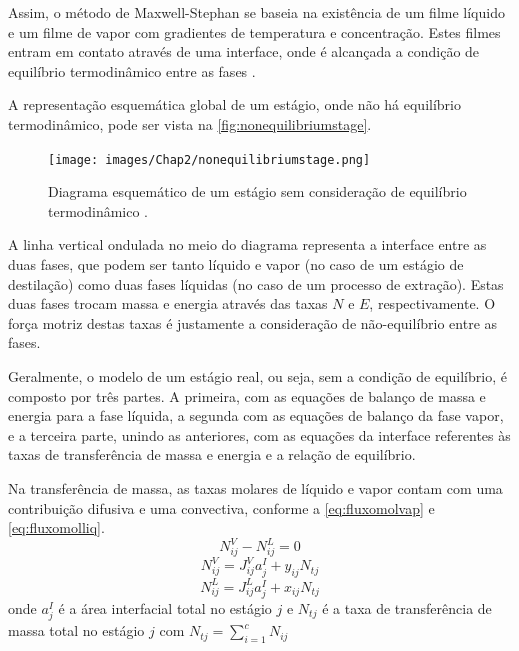 Assim, o método de Maxwell-Stephan se baseia na existência de um filme líquido e um filme de vapor com gradientes de
temperatura e concentração. Estes filmes entram em contato através de uma interface, onde é alcançada a condição de
equilíbrio termodinâmico entre as fases \cite{Koeijer:2004}.

A representação esquemática global de um estágio, onde não há equilíbrio termodinâmico, pode ser vista na
\autoref{fig:nonequilibriumstage}.
 \begin{figure}[htb]
 \centering \texttt{[image: images/Chap2/nonequilibriumstage.png]}
 \caption{Diagrama esquemático de um estágio sem consideração de equilíbrio termodinâmico \cite{Kooijman:1995a}.}
 \label{fig:nonequilibriumstage}
 \end{figure}
A linha vertical ondulada no meio do diagrama representa a interface entre as duas fases, que podem ser tanto líquido e
vapor (no caso de um estágio de destilação) como duas fases líquidas (no caso de
um processo de extração). Estas duas fases trocam massa e energia através das
taxas $N$ e $E$, respectivamente. O força motriz destas taxas é justamente a
consideração de não-equilíbrio entre as fases.

Geralmente, o modelo de um estágio real, ou seja, sem a condição de equilíbrio, é composto por três partes. A primeira,
com as equações de balanço de massa e energia para a fase líquida, a segunda com as equações de balanço da fase vapor,
e a terceira parte, unindo as anteriores, com as equações da interface referentes às taxas de transferência de massa
e energia e a relação de equilíbrio.

Na transferência de massa, as taxas molares de líquido e vapor contam com uma contribuição difusiva e uma convectiva,
conforme a \autoref{eq:fluxomolvap} e \ref{eq:fluxomolliq}. %
\begin{equation}
N^V_{ij} - N^L_{ij}= 0
\label{eq:equilfluxomol}
\end{equation}
\begin{equation}
N^V_{ij} = J^V_{ij}a_j^I + y_{ij}N_{tj}
\label{eq:fluxomolvap}
\end{equation}
\begin{equation}
N^L_{ij} = J^L_{ij}a_j^I + x_{ij}N_{tj}
\label{eq:fluxomolliq}
\end{equation}
onde $a^I_j$ é a área interfacial total no estágio $j$ e $N_{tj}$ é a taxa de
transferência de massa total no estágio $j$ com $N_{tj} =
\displaystyle\sum_{i=1}^c N_{ij}$

